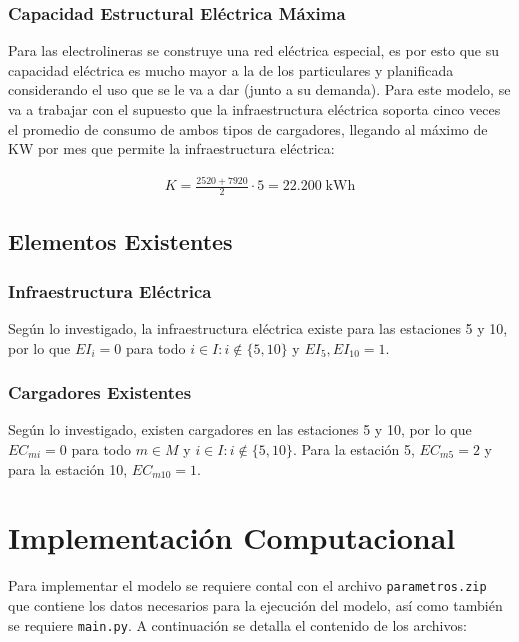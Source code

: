 \documentclass[letterpaper]{article}
\begin{document}
\begin{flushleft}
	\subsubsection{Capacidad Estructural Eléctrica Máxima}

	Para las electrolineras se construye una red eléctrica especial, es por esto que su capacidad eléctrica es mucho mayor a la de los particulares y planificada considerando el uso que se le va a dar (junto a su demanda). Para este modelo, se va a trabajar con el supuesto que la infraestructura eléctrica soporta cinco veces el promedio de consumo de ambos tipos de cargadores, llegando al máximo de KW por mes que permite la infraestructura eléctrica:

	\begin{align*}
		K = \frac{2520 + 7920}{2} \cdot 5= 22.200 \; \text{kWh}
	\end{align*}

	\subsection{Elementos Existentes}

	\subsubsection{Infraestructura Eléctrica}

	Según lo investigado, la infraestructura eléctrica existe para las estaciones 5 y 10, por lo que $EI_i = 0$ para todo $i \in I: i \not \in \{5,10\}$ y $EI_5,EI_{10}=1$.

	\subsubsection{Cargadores Existentes}

	Según lo investigado, existen cargadores en las estaciones 5 y 10, por lo que $EC_{mi} = 0$ para todo $m \in M$ y $i \in I: i \not \in \{5,10\}$. Para la estación 5, $EC_{m5} = 2$ y para la estación 10, $EC_{m10} = 1$.

	\section{Implementación Computacional}

	Para implementar el modelo se requiere contal con el archivo \texttt{parametros.zip} que contiene los datos necesarios para la ejecución del modelo, así como también se requiere \texttt{main.py}. A continuación se detalla el contenido de los archivos:


\end{flushleft}
\end{document}

